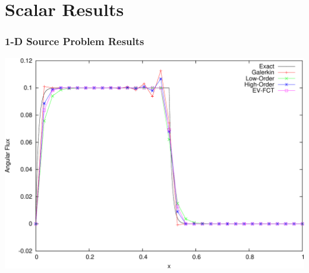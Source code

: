 \documentclass{beamer} \useoutertheme{infolines}
\begin{document}
\section{Scalar Results}
\begin{frame}
\frametitle{1-D Source Problem Results}

\begin{center}
\includegraphics[height=0.8\textheight]{./figures/solutions_source_FE.pdf}
\end{center}

\end{frame}
\end{document}
